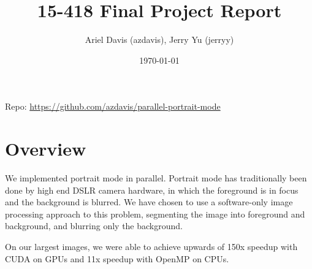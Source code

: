 \documentclass[12pt]{article}
\author{Ariel Davis (azdavis), Jerry Yu (jerryy)}
\date{\today}
\title{15-418 Final Project Report}
\begin{document}
\maketitle

Repo: \url{https://github.com/azdavis/parallel-portrait-mode}

\section{Overview}

We implemented portrait mode in parallel. Portrait mode has traditionally been
done by high end DSLR camera hardware, in which the foreground is in focus and
the background is blurred. We have chosen to use a software-only image
processing approach to this problem, segmenting the image into foreground and
background, and blurring only the background.

On our largest images, we were able to achieve upwards of 150x speedup with
CUDA on GPUs and 11x speedup with OpenMP on CPUs.
\end{document}
